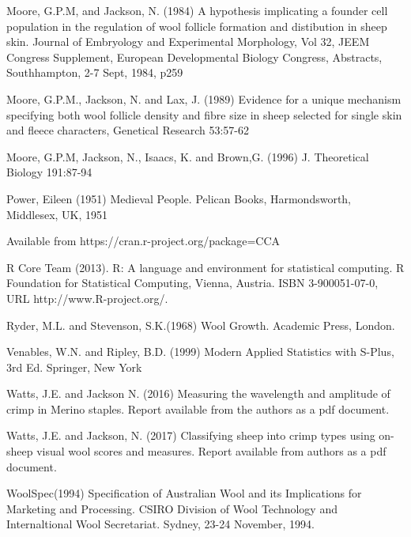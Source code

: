 \documentclass[titlepage]{article}  %
\begin{document}
\begin{thebibliography}{99}
Moore, G.P.M, and Jackson, N. (1984) A hypothesis implicating a founder cell population in the regulation of wool follicle formation and distibution in sheep skin. Journal of Embryology and Experimental Morphology, Vol 32, JEEM Congress Supplement, European Developmental Biology Congress, Abstracts, Southhampton, 2-7 Sept, 1984, p259

Moore, G.P.M., Jackson, N. and Lax, J. (1989) Evidence for a unique mechanism specifying both wool follicle density and fibre size in sheep selected for single skin and fleece characters, Genetical Research 53:57-62

Moore, G.P.M, Jackson, N., Isaacs, K. and Brown,G. (1996) J. Theoretical Biology 191:87-94

Power, Eileen (1951) Medieval People. Pelican Books, Harmondsworth, Middlesex, UK, 1951

Available from https://cran.r-project.org/package=CCA

R Core Team (2013). R: A language and environment for statistical
  computing. R Foundation for Statistical Computing, Vienna, Austria.
  ISBN 3-900051-07-0, URL http://www.R-project.org/.

Ryder, M.L. and Stevenson, S.K.(1968) Wool Growth. Academic Press, London.

Venables, W.N. and Ripley, B.D. (1999)
Modern Applied Statistics with S-Plus, 3rd Ed. Springer, New York

Watts, J.E. and Jackson N. (2016) Measuring the wavelength and amplitude of crimp in Merino staples.   Report available from the authors as a pdf document.

Watts, J.E. and Jackson, N. (2017) Classifying sheep into crimp types using on-sheep visual wool scores and measures. Report available from authors as a pdf document.

WoolSpec(1994) Specification of Australian Wool and its Implications for Marketing and Processing. CSIRO Division of Wool Technology and Internaltional Wool Secretariat. Sydney, 23-24 November, 1994.
\end{thebibliography}
\end{document}
